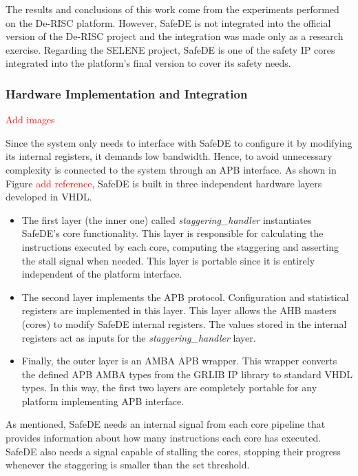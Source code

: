 The results and conclusions of this work come from the experiments performed on the De-RISC platform. However, SafeDE is not integrated into the official version of the De-RISC project and the integration was made only as a research exercise. Regarding the SELENE project, SafeDE is one of the safety IP cores integrated into the platform's final version to cover its safety needs.
\bigskip

\subsubsection{Hardware Implementation and Integration}
\textcolor{red}{Add images}

Since the system only needs to interface with SafeDE to configure it by modifying its internal registers, it demands low bandwidth. Hence, to avoid unnecessary complexity is connected to the system through an APB interface. As shown in Figure \textcolor{red}{add reference}, SafeDE is built in three independent hardware layers developed in VHDL. 

\begin{itemize}
    \item The first layer (the inner one) called \textit{staggering\_handler} instantiates SafeDE's core functionality. This layer is responsible for calculating the instructions executed by each core, computing the staggering and asserting the stall signal when needed. This layer is portable since it is entirely independent of the platform interface. 
    \item The second layer implements the APB protocol. Configuration and statistical registers are implemented in this layer. This layer allows the AHB masters (cores) to modify SafeDE internal registers. The values stored in the internal registers act as inputs for the \textit{staggering\_handler} layer.
    \item Finally, the outer layer is an AMBA APB wrapper. This wrapper converts the defined APB AMBA types from the GRLIB IP library to standard VHDL types. In this way, the first two layers are completely portable for any platform implementing APB interface.
\end{itemize}

As mentioned, SafeDE needs an internal signal from each core pipeline that provides information about how many instructions each core has executed. SafeDE also needs a signal capable of stalling the cores, stopping their progress whenever the staggering is smaller than the set threshold. 

